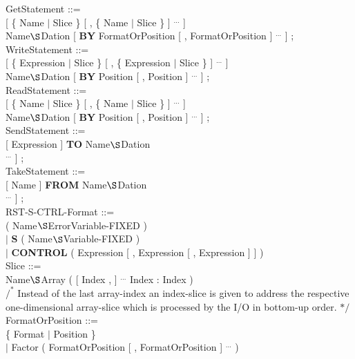 GetStatement ::=\\
 [ \{ Name $\mid$ Slice \} [ , \{ Name $\mid$ Slice \} ] $^{...}$ ]\\
 Name$\S $Dation [ {\bf BY} FormatOrPosition [ , FormatOrPosition ] $^{...}$ ] ;\\

WriteStatement ::=\\
 [ \{ Expression $\mid$ Slice \} [ , \{ Expression $\mid$ Slice \} ] $^{...}$ ]\\
 Name$\S $Dation [ {\bf BY} Position [ , Position ] $^{...}$ ] ; \\
        
ReadStatement ::=\\
 [ \{ Name $\mid$ Slice \} [ , \{ Name $\mid$ Slice \} ] $^{...}$ ]\\
 Name$\S $Dation [ {\bf BY} Position [ , Position ] $^{...}$ ] ;\\
        
SendStatement ::=\\
 [ Expression ] {\bf TO} Name$\S $Dation\\
\x [ {\bf BY} RST-S-CTRL-Format [ , RST-S-CTRL-Format ] $^{...}$ ] ;\\

TakeStatement ::=\\
 [ Name ] {\bf FROM} Name$\S $Dation\\
\x [ {\bf BY} RST-S-CTRL-Format [ , RST-S-CTRL-Format ] $^{...}$ ] ;\\

RST-S-CTRL-Format ::=\\
 ( Name$\S $ErrorVariable-FIXED )\\
\x $\mid$ {\bf S} ( Name$\S $Variable-FIXED )\\
\x $\mid$ {\bf CONTROL} ( Expression [ , Expression [ , Expression ] ] )\\

Slice ::=\\
\x Name$\S $Array ( [ Index , ] $^{...}$ Index : Index )\\
\x $/^*$ Instead of the last array-index an index-slice is given to address 
the respective one-dimensional array-slice which is processed by the I/O 
in bottom-up order. $*/$\\

FormatOrPosition ::=\\
\x [ Factor ] \{ Format $\mid$ Position \}\\
\x $\mid$ Factor ( FormatOrPosition [ , FormatOrPosition ] $^{...}$ )\\
        
